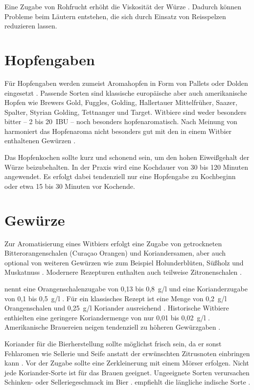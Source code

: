 \documentclass[a4paper,parskip=half]{scrartcl}
\begin{document}
Eine Zugabe von Rohfrucht erhöht die Viskosität der Würze \parencite[9]{Strottner1999}. Dadurch können Probleme beim Läutern entstehen, die
sich durch Einsatz von Reisspelzen reduzieren lassen.

\section*{Hopfengaben}

Für Hopfengaben werden zumeist Aromahopfen in Form von Pallets
oder Dolden eingesetzt \parencite[1]{Strottner1999}. Passende
Sorten sind klassische europäische aber auch amerikanische
Hopfen wie Brewers Gold, Fuggles, Golding, Hallertauer Mittelfrüher,
Saazer, Spalter, Styrian Golding, Tettnanger und Target.
Witbiere sind weder besonders bitter – 2 bis 20~IBU – noch
besonders hopfenaromatisch. Nach Meinung von \citeauthor{Zainasheff2007}
harmoniert das Hopfenaroma nicht besonders gut mit den in einem Witbier
enthaltenen Gewürzen \parencite{Zainasheff2007}.

Das Hopfenkochen sollte kurz und schonend sein, um den hohen Eiweißgehalt der
Würze beizubehalten. In der Praxis wird eine Kochdauer von 30 bis 120
Minuten angewendet. Es erfolgt dabei tendenziell nur eine Hopfengabe zu
Kochbeginn oder etwa 15 bis 30 Minuten vor Kochende. \parencite[13,17,23-113]{Strottner1999}

\section*{Gewürze}

Zur Aromatisierung eines Witbiers erfolgt eine Zugabe von getrockneten
Bitterorangenschalen (Curaçao Orangen) und Koriandersamen, aber auch
optional von weiteren Gewürzen wie zum Beispiel Holunderblüten,
Süßholz und Muskatnuss \parencite[1]{Strottner1999}. Modernere
Rezepturen enthalten auch teilweise Zitronenschalen \parencites[24]{BA2021}.

\citeauthor{Strottner1999} nennt eine Orangenschalenzugabe von
0,13 bis 0,8~g/l und eine Korianderzugabe
von 0,1 bis 0,5~g/l \parencite[13]{Strottner1999}.
Für ein klassisches Rezept ist eine Menge von 0,2~g/l Orangenschalen
und 0,25~g/l Koriander ausreichend \parencite[29]{Sparrow2002}.
Historische Witbiere enthielten eine geringere Koriandermenge
von nur 0,01 bis 0,02~g/l \parencite[40]{Hieronymus2010}.
Amerikanische Brauereien neigen tendenziell zu höheren
Gewürzgaben \parencite[26]{Strong2021}.

Koriander für die Bierherstellung sollte möglichst frisch sein, da
er sonst Fehlaromen wie Sellerie und Seife anstatt der erwünschten
Zitrusnoten einbringen kann \parencite[26]{Strong2021}. Vor der Zugabe
sollte eine Zerkleinerung mit einem Mörser erfolgen.
Nicht jede Koriander-Sorte ist für das Brauen geeignet. Ungeeignete
Sorten verursachen Schinken- oder Selleriegeschmack im Bier
\parencites[48]{BJCP2015}. \citeauthor{Mosher2015} empfiehlt die längliche
indische Sorte \parencite[338\psq]{Mosher2015}.
\end{document}
